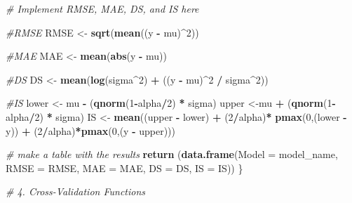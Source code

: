 \documentclass[
]{article}
\newenvironment{Shaded}{\begin{snugshade}}{\end{snugshade}}
\newcommand{\AttributeTok}[1]{\textcolor[rgb]{0.13,0.29,0.53}{#1}}
\newcommand{\CommentTok}[1]{\textcolor[rgb]{0.56,0.35,0.01}{\textit{#1}}}
\newcommand{\DecValTok}[1]{\textcolor[rgb]{0.00,0.00,0.81}{#1}}
\newcommand{\FunctionTok}[1]{\textcolor[rgb]{0.13,0.29,0.53}{\textbf{#1}}}
\newcommand{\NormalTok}[1]{#1}
\newcommand{\OtherTok}[1]{\textcolor[rgb]{0.56,0.35,0.01}{#1}}
\newcommand{\SpecialCharTok}[1]{\textcolor[rgb]{0.81,0.36,0.00}{\textbf{#1}}}
\begin{document}
\begin{Shaded}
\begin{Highlighting}[]
  \CommentTok{\# Implement RMSE, MAE, DS, and IS here}
  
  \CommentTok{\#RMSE}
\NormalTok{  RMSE }\OtherTok{\textless{}{-}} \FunctionTok{sqrt}\NormalTok{(}\FunctionTok{mean}\NormalTok{((y }\SpecialCharTok{{-}}\NormalTok{ mu)}\SpecialCharTok{\^{}}\DecValTok{2}\NormalTok{))}
  
  \CommentTok{\#MAE}
\NormalTok{  MAE }\OtherTok{\textless{}{-}} \FunctionTok{mean}\NormalTok{(}\FunctionTok{abs}\NormalTok{(y }\SpecialCharTok{{-}}\NormalTok{ mu))}
  
  \CommentTok{\#DS}
\NormalTok{  DS }\OtherTok{\textless{}{-}} \FunctionTok{mean}\NormalTok{(}\FunctionTok{log}\NormalTok{(sigma}\SpecialCharTok{\^{}}\DecValTok{2}\NormalTok{) }\SpecialCharTok{+}\NormalTok{ ((y }\SpecialCharTok{{-}}\NormalTok{ mu)}\SpecialCharTok{\^{}}\DecValTok{2} \SpecialCharTok{/}\NormalTok{ sigma}\SpecialCharTok{\^{}}\DecValTok{2}\NormalTok{))}
  
  \CommentTok{\#IS}
\NormalTok{  lower }\OtherTok{\textless{}{-}}\NormalTok{ mu }\SpecialCharTok{{-}}\NormalTok{ (}\FunctionTok{qnorm}\NormalTok{(}\DecValTok{1}\SpecialCharTok{{-}}\NormalTok{alpha}\SpecialCharTok{/}\DecValTok{2}\NormalTok{) }\SpecialCharTok{*}\NormalTok{ sigma)}
\NormalTok{  upper }\OtherTok{\textless{}{-}}\NormalTok{mu }\SpecialCharTok{+}\NormalTok{ (}\FunctionTok{qnorm}\NormalTok{(}\DecValTok{1}\SpecialCharTok{{-}}\NormalTok{alpha}\SpecialCharTok{/}\DecValTok{2}\NormalTok{) }\SpecialCharTok{*}\NormalTok{ sigma)}
\NormalTok{  IS }\OtherTok{\textless{}{-}}  \FunctionTok{mean}\NormalTok{((upper }\SpecialCharTok{{-}}\NormalTok{ lower) }\SpecialCharTok{+} 
\NormalTok{                (}\DecValTok{2}\SpecialCharTok{/}\NormalTok{alpha)}\SpecialCharTok{*} \FunctionTok{pmax}\NormalTok{(}\DecValTok{0}\NormalTok{,(lower }\SpecialCharTok{{-}}\NormalTok{ y)) }\SpecialCharTok{+} 
\NormalTok{                (}\DecValTok{2}\SpecialCharTok{/}\NormalTok{alpha)}\SpecialCharTok{*}\FunctionTok{pmax}\NormalTok{(}\DecValTok{0}\NormalTok{,(y }\SpecialCharTok{{-}}\NormalTok{ upper)))}
  
  \CommentTok{\# make a table with the results}
  \FunctionTok{return}\NormalTok{ (}\FunctionTok{data.frame}\NormalTok{(}\AttributeTok{Model =}\NormalTok{ model\_name, }\AttributeTok{RMSE =}\NormalTok{ RMSE, }\AttributeTok{MAE =}\NormalTok{ MAE, }\AttributeTok{DS =}\NormalTok{ DS, }\AttributeTok{IS =}\NormalTok{ IS))}
\NormalTok{\}}





\CommentTok{\# 4. Cross{-}Validation Functions}


\end{Highlighting}
\end{Shaded}
\end{document}
